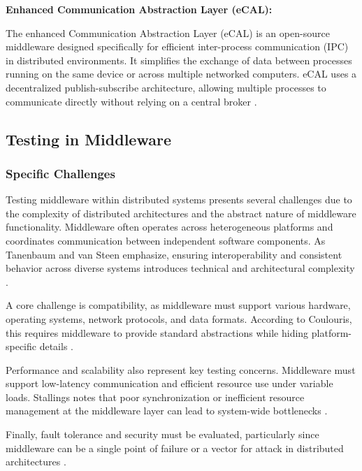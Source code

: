 \vspace{1em}
\textbf{Enhanced Communication Abstraction Layer (eCAL):}
\vspace{0.4em}

The enhanced Communication Abstraction Layer (eCAL) is an open-source middleware designed specifically for efficient inter-process communication (IPC) in distributed environments. It simplifies the exchange of data between processes running on the same device or across multiple networked computers. eCAL uses a decentralized publish-subscribe architecture, allowing multiple processes to communicate directly without relying on a central broker \cite{ecal_github}.

\subsection{Testing in Middleware}

\subsubsection{Specific Challenges}

Testing middleware within distributed systems presents several challenges due to the complexity of distributed architectures and the abstract nature of middleware functionality. Middleware often operates across heterogeneous platforms and coordinates communication between independent software components. As Tanenbaum and van Steen emphasize, ensuring interoperability and consistent behavior across diverse systems introduces technical and architectural complexity \cite{tanenbaum2017}.

\newpage
A core challenge is compatibility, as middleware must support various hardware, operating systems, network protocols, and data formats. According to Coulouris, this requires middleware to provide standard abstractions while hiding platform-specific details \cite{coulouris2012}. 

\vspace{1em}
Performance and scalability also represent key testing concerns. Middleware must support low-latency communication and efficient resource use under variable loads. Stallings notes that poor synchronization or inefficient resource management at the middleware layer can lead to system-wide bottlenecks \cite{stallings2018}.

\vspace{1em}
Finally, fault tolerance and security must be evaluated, particularly since middleware can be a single point of failure or a vector for attack in distributed architectures \cite{liu2009middleware}.

